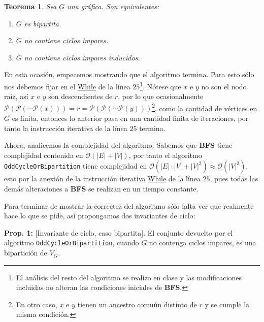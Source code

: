 \documentclass{article}
\newcommand{\code}[1]{\textcolor{white!25!black}{\texttt{#1}}}
\newtheorem*{theorem}{Teorema}
\begin{document}
\begin{enumerate}
\begin{center}
{\begin{minipage}[b][1\height]
        \begin{theorem}
          Sea $G$ una gr\'afica. Son equivalentes:
          \begin{enumerate}
          \item $G$ es bipartita.
          \item $G$ no contiene ciclos impares.
          \item $G$ no contiene ciclos impares inducidos.
          \end{enumerate}
          
        \end{theorem}
    \end{minipage}}
  \end{center}
  En esta ocasi\'on, empecemos mostrando que el algoritmo termina.
  Para esto s\'olo nos debemos fijar en el \underline{While} de  la
  l\'inea $25$\footnote{El an\'alisis del resto del algoritmo se
    realizo en clase y las modificaciones incluidas no alteran las
    condiciones iniciales de \textbf{BFS}.}. N\'otese que $x$ e $y$
  no son el nodo  ra\'iz, as\'i $x$ e $y$ son descendientes de $r$,
  por lo que ocasionalmente $\mathcal{P}(\mathcal{P}(\dotsm\mathcal{P}
  (x))) = r = \mathcal{P}(\mathcal{P}(\dotsm\mathcal{P}(y)))$\footnote{En
    otro caso, $x$ e $y$ tienen un ancestro comu\'un distinto de $r$
    y se cumple la misma condici\'on.}, como la cantidad de v\'ertices
  en $G$ es finita, entonces lo anterior pasa en una cantidad finita
  de iteraciones, por tanto la instrucci\'on iterativa de la l\'inea
  $25$ termina.
  
  Ahora, analicemos la complejidad del algoritmo. Sabemos que \textbf{BFS}
  tiene complejidad contenida en $\mathcal{O}(|E| + |V|)$, por tanto el
  algoritmo \code{OddCycleOrBipartition} tiene complejidad en $\mathcal{O}
  (|E|\cdot|V| + |V|^2) \approx \mathcal{O}(|V|^2)$, esto por la anexi\'on
  de la instrucci\'on iterativa \underline{While} de la l\'inea $25$, pues
  todas las dem\'as alteraciones a \textbf{BFS} se realizan en un tiempo constante.
  
  Para terminar de mostrar la correctez del algoritmo sólo falta ver que
  realmente hace lo que se pide, as\'i propongamos dos invariantes de ciclo:
  
  \textbf{Prop. 1:} [Invariante de ciclo, caso bipartita]. El conjunto
  devuelto por el algoritmo \code{OddCycleOrBipartition}, cuando $G$
  no contenga ciclos impares, es una bipartici\'on de $V_G$.  
  

\end{enumerate}
\end{document}
